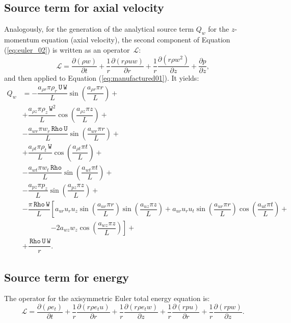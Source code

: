\documentclass[10pt]{article}
\newcommand{\Diff}[2] {\dfrac{\partial( #1)}{\partial #2}}
\newcommand{\diff}[2] {\dfrac{\partial #1}{\partial #2}}
\newcommand{\Lo}{\,\mathcal{L}}
\newcommand{\Rho}{\,\mathtt{Rho}}
\newcommand{\U}{\,\mathtt{U}}
\newcommand{\W}{\,\mathtt{W}}
\begin{document}
\subsection{Source term for axial velocity}
Analogously, for the generation of the analytical source term $Q_w$ for the $z$-momentum equation (axial velocity), the second component of Equation  (\ref{eq:euler_02})  is written as an  operator $\Lo$:
\begin{equation*}
   \Lo = \Diff{\rho w}{t} +\dfrac{1}{r}\Diff{r \rho u w  }{r}+ \dfrac{1}{r}\Diff{r \rho w^2 }{z}+\diff{p}{z} ,
\end{equation*}
and then applied to Equation  (\ref{eq:manufactured01}). It yields:
\begin{equation}
 \begin{split}
 \displaystyle
Q_w &= -\dfrac{a_{\rho r} \pi \rho_r \U \W }{L}\sin\left(\dfrac{a_{\rho r} \pi r}{L}\right)+ \\
&+\dfrac{a_{\rho z} \pi \rho_z \W^2 }{L}\cos\left(\dfrac{a_{\rho z} \pi z}{L}\right)+ \\
&-\dfrac{a_{wr} \pi w_r \Rho \U}{L}\sin\left(\dfrac{a_{wr} \pi r}{L}\right) + \\
&+\dfrac{a_{\rho t} \pi \rho_t \W }{L}\cos\left(\dfrac{a_{\rho t} \pi t}{L}\right)+ \\
&-\dfrac{a_{wt} \pi w_t \Rho}{L}\sin\left(\dfrac{a_{wt} \pi t}{L}\right) + \\
&-\dfrac{a_{pz} \pi p_z }{L}\sin\left(\dfrac{a_{pz} \pi z}{L}\right)+ \\
&-\dfrac{\pi \Rho \W}{L}\left[ a_{ur} u_r u_z \sin\left(\dfrac{a_{ur} \pi r}{L}\right) \sin\left(\dfrac{a_{uz} \pi z}{L}\right)+a_{ur} u_r u_t \sin\left(\dfrac{a_{ur} \pi r}{L}\right) \cos\left(\dfrac{a_{ut} \pi t}{L}\right)\right.+\\
    &\qquad\qquad\left.-2 a_{wz} w_z \cos\left(\dfrac{a_{wz} \pi z}{L}\right)\right] + \\
&+\dfrac{\Rho \U \W}{r}.
\end{split}
\end{equation}



\subsection{Source term for energy}

The operator for the axisymmetric Euler total energy equation is:
\begin{equation*}
 \Lo= \Diff{\rho e_t}{ t}+\dfrac{1}{r}\Diff{r \rho e_t u}{ r}+\dfrac{1}{r}\Diff{r \rho e_t w}{z} +\dfrac{1}{r}\Diff{r p  u}{ r}+\dfrac{1}{r}\Diff{r p w}{z} .
\end{equation*}
\end{document}
